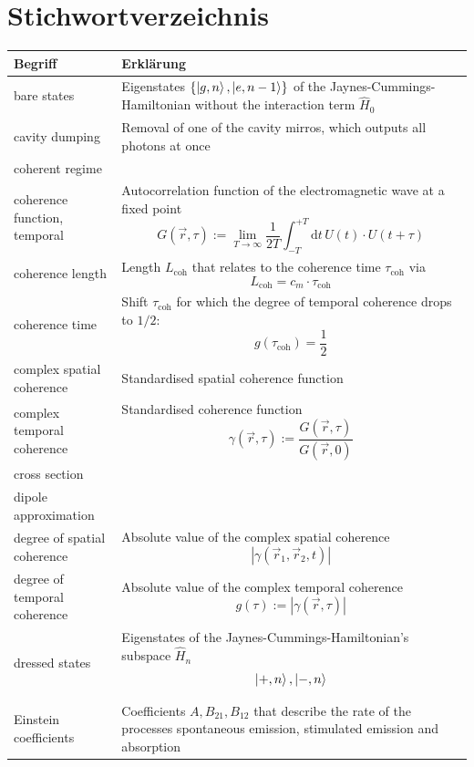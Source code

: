 \documentclass{article}
\newcommand{\diff}{\mathrm{d}}
\begin{document}
\newpage


\section{Stichwortverzeichnis}
\begin{xltabular}{\linewidth}{p{6cm}|X}
	\hline\hline
		Begriff & Erklärung \\
	\hline
		bare states & Eigenstates $\{\ket{g,n}, \ket{e,n-1}\}$ of the Jaynes-Cummings-Hamiltonian without the interaction term $\hat{H}_0$ \\
	\hline
		cavity dumping & Removal of one of the cavity mirros, which outputs all photons at once \\
	\hline
		coherent regime &  \\
	\hline
		coherence function, temporal & Autocorrelation function of the electromagnetic wave at a fixed point
			$$G(\vec{r},\tau) := \lim\limits_{T\to\infty} \frac{1}{2T} \int_{-T}^{+T} \diff t \, U(t) \cdot U(t+\tau)$$ \\
	\hline
		coherence length & Length $L_\text{coh}$ that relates to the coherence time $\tau_\text{coh}$ via
			$$L_\text{coh} = c_m \cdot \tau_\text{coh}$$ \\
	\hline
		coherence time & Shift $\tau_\text{coh}$ for which the degree of temporal coherence drops to $1/2$:
			$$g(\tau_\text{coh}) = \frac{1}{2}$$ \\
	\hline
		complex spatial coherence & Standardised spatial coherence function \\
	\hline
		complex temporal coherence & Standardised coherence function
			$$\gamma(\vec{r},\tau) := \frac{G(\vec{r},\tau)}{G(\vec{r},0)}$$ \\
	\hline
		cross section & \\
	\hline
		dipole approximation &  \\
	\hline
		degree of spatial coherence & Absolute value of the complex spatial coherence
			$$|\gamma(\vec{r}_1,\vec{r}_2,t)|$$ \\
	\hline
		degree of temporal coherence & Absolute value of the complex temporal coherence
			$$g(\tau) := |\gamma(\vec{r},\tau)|$$ \\
	\hline
		dressed states & Eigenstates of the Jaynes-Cummings-Hamiltonian's subspace $\hat{H}_n$ 
			$$\ket{+,n}, \ket{-,n}$$ \\
	\hline
		Einstein coefficients & Coefficients $A, B_{21}, B_{12}$ that describe the rate of the processes spontaneous emission, stimulated emission and absorption \\

\end{xltabular}
\end{document}
